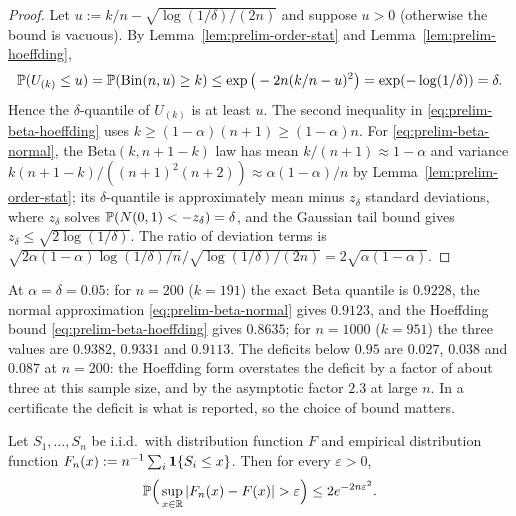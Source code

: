 \documentclass[../../../main.tex]{subfiles}
\begin{document}
\begin{proof}
Let $u:=k/n-\sqrt{\log(1/\delta)/(2n)}$ and suppose $u>0$ (otherwise the bound is vacuous). By Lemma~\ref{lem:prelim-order-stat} and Lemma~\ref{lem:prelim-hoeffding},
\[
\mathbb{P}(U_{(k)}\le u)=\mathbb{P}(\mathrm{Bin}(n,u)\ge k)\le\exp\big(-2n(k/n-u)^2\big)=\exp(-\log(1/\delta))=\delta .
\]
Hence the $\delta$-quantile of $U_{(k)}$ is at least $u$. The second inequality in \eqref{eq:prelim-beta-hoeffding} uses $k\ge(1-\alpha)(n+1)\ge(1-\alpha)n$. For \eqref{eq:prelim-beta-normal}, the Beta$(k,n+1-k)$ law has mean $k/(n+1)\approx1-\alpha$ and variance $k(n+1-k)/((n+1)^2(n+2))\approx\alpha(1-\alpha)/n$ by Lemma~\ref{lem:prelim-order-stat}; its $\delta$-quantile is approximately mean minus $z_\delta$ standard deviations, where $z_\delta$ solves $\mathbb{P}(N(0,1)<-z_\delta)=\delta$, and the Gaussian tail bound gives $z_\delta\le\sqrt{2\log(1/\delta)}$. The ratio of deviation terms is $\sqrt{2\alpha(1-\alpha)\log(1/\delta)/n}\big/\sqrt{\log(1/\delta)/(2n)}=2\sqrt{\alpha(1-\alpha)}$.
\end{proof}

\begin{example}\label{ex:prelim-beta-numbers}
At $\alpha=\delta=0.05$: for $n=200$ ($k=191$) the exact Beta quantile is $0.9228$, the normal approximation \eqref{eq:prelim-beta-normal} gives $0.9123$, and the Hoeffding bound \eqref{eq:prelim-beta-hoeffding} gives $0.8635$; for $n=1000$ ($k=951$) the three values are $0.9382$, $0.9331$ and $0.9113$. The deficits below $0.95$ are $0.027$, $0.038$ and $0.087$ at $n=200$: the Hoeffding form overstates the deficit by a factor of about three at this sample size, and by the asymptotic factor $2.3$ at large $n$. In a certificate the deficit is what is reported, so the choice of bound matters.
\end{example}


\begin{theorem}\label{thm:prelim-dkw}
Let $S_1,\dots,S_n$ be i.i.d.\ with distribution function $F$ and empirical distribution function $F_n(x):=n^{-1}\sum_i\mathbf{1}\{S_i\le x\}$. Then for every $\varepsilon>0$,
\[
\Prob\Big(\sup_{x\in\R}|F_n(x)-F(x)|>\varepsilon\Big)\le2e^{-2n\varepsilon^2}.
\]
\end{theorem}
\end{document}
